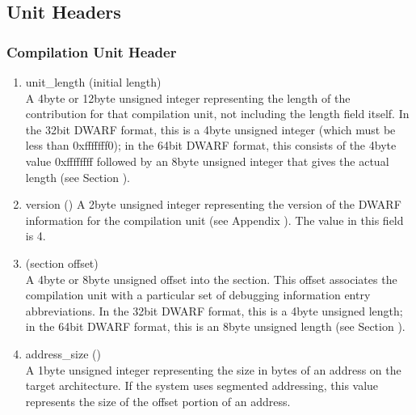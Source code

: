 \subsection{Unit Headers}
\label{datarep:unitheaders}

\subsubsection{Compilation Unit Header}
\label{datarep:compilationunitheader}

\begin{enumerate}[1.]

\item unit\_length (initial length) \\
A 4\dash byte or 12\dash byte 
unsigned integer representing the length
of the 
contribution for that compilation unit,
not including the length field itself. In the 32\dash bit DWARF
format, this is a 4\dash byte unsigned integer (which must be less
than 0xfffffff0); in the 64\dash bit DWARF format, this consists
of the 4\dash byte value 0xffffffff followed by an 8\dash byte unsigned
integer that gives the actual length 
(see Section ).

\item  version ()
A 2\dash byte unsigned integer representing the version of the
DWARF information for the compilation unit 
(see Appendix ). 
The value in this field is 4.

\item {} (section offset) \\
A 
4\dash byte or 8\dash byte unsigned offset into the 
section. This offset associates the compilation unit with a
particular set of debugging information entry abbreviations. In
the 32\dash bit DWARF format, this is a 4\dash byte unsigned length;
in the 64\dash bit DWARF format, this is an 8\dash byte unsigned length
(see Section ).

\item address\_size () \\
A 1\dash byte unsigned integer representing the size in bytes of
an address on the target architecture. If the system uses
segmented addressing, this value represents the size of the
offset portion of an address.




\end{enumerate}

